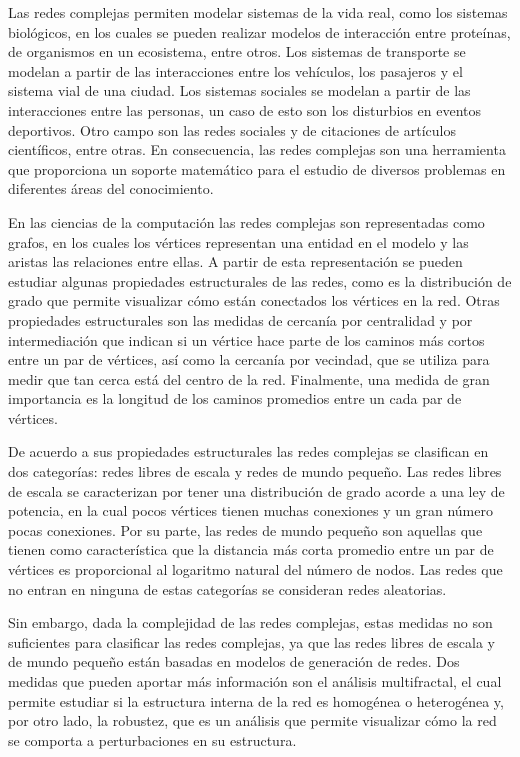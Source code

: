 Las redes complejas permiten modelar sistemas de la vida real, como los sistemas biológicos, en los cuales se pueden realizar modelos de interacción entre proteínas, de organismos en un ecosistema, entre otros. Los sistemas de transporte se modelan a partir de las interacciones entre los vehículos, los pasajeros y el sistema vial de una ciudad. Los sistemas sociales se modelan a partir de las interacciones entre las personas, un caso de esto son los disturbios en eventos deportivos. Otro campo son las redes sociales y de citaciones de artículos científicos, entre otras. En consecuencia, las redes complejas son una herramienta que proporciona un soporte matemático para el estudio de diversos problemas en diferentes áreas del conocimiento.

En las ciencias de la computación las redes complejas son representadas como grafos, en los cuales los vértices representan una entidad en el modelo y las aristas las relaciones entre ellas. A partir de esta representación se pueden estudiar algunas propiedades estructurales de las redes, como es la distribución de grado que permite visualizar cómo están conectados los vértices en la red. Otras propiedades estructurales son las medidas de cercanía por centralidad y por intermediación que indican si un vértice hace parte de los caminos más cortos entre un par de vértices, así como la cercanía por vecindad, que se utiliza para medir que tan cerca está del centro de la red. Finalmente, una medida de gran importancia es la longitud de los caminos promedios entre un cada par de vértices.

De acuerdo a sus propiedades estructurales las redes complejas se clasifican en dos categorías: redes libres de escala y redes de mundo pequeño. Las redes libres de escala se caracterizan por tener una distribución de grado acorde a una ley de potencia, en la cual pocos vértices tienen muchas conexiones y un gran número pocas conexiones. Por su parte, las redes de mundo pequeño son aquellas que tienen como característica que la distancia más corta promedio entre un par de vértices es proporcional al logaritmo natural del número de nodos. Las redes que no entran en ninguna de estas categorías se consideran redes aleatorias.

Sin embargo, dada la complejidad de las redes complejas, estas medidas no son suficientes para clasificar las redes complejas, ya que las redes libres de escala y de mundo pequeño están basadas en modelos de generación de redes. Dos medidas que pueden aportar más información son el análisis multifractal, el cual permite estudiar si la estructura interna de la red es homogénea o heterogénea y, por otro lado, la robustez, que es un análisis que permite visualizar cómo la red se comporta a perturbaciones en su estructura.

